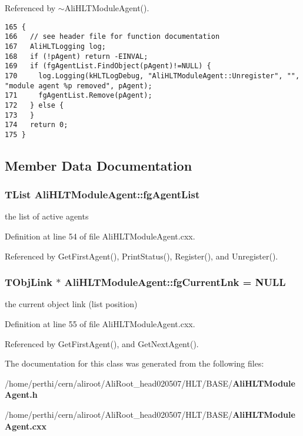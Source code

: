 Referenced by $\sim$Ali\-HLTModule\-Agent().

\footnotesize\begin{verbatim}165 {
166   // see header file for function documentation
167   AliHLTLogging log;
168   if (!pAgent) return -EINVAL;
169   if (fgAgentList.FindObject(pAgent)!=NULL) {
170     log.Logging(kHLTLogDebug, "AliHLTModuleAgent::Unregister", "", "module agent %p removed", pAgent);
171     fgAgentList.Remove(pAgent);
172   } else {
173   }
174   return 0;
175 }
\end{verbatim}\normalsize 




\subsection{Member Data Documentation}
\subsubsection{\setlength{\rightskip}{0pt plus 5cm}TList {\bf Ali\-HLTModule\-Agent::fg\-Agent\-List}\hspace{0.3cm}{\tt  [static, private]}}\label{classAliHLTModuleAgent_v0}


the list of active agents 

Definition at line 54 of file Ali\-HLTModule\-Agent.cxx.

Referenced by Get\-First\-Agent(), Print\-Status(), Register(), and Unregister().
\subsubsection{\setlength{\rightskip}{0pt plus 5cm}TObj\-Link $\ast$ {\bf Ali\-HLTModule\-Agent::fg\-Current\-Lnk} = NULL\hspace{0.3cm}{\tt  [static, private]}}\label{classAliHLTModuleAgent_v1}


the current object link (list position) 

Definition at line 55 of file Ali\-HLTModule\-Agent.cxx.

Referenced by Get\-First\-Agent(), and Get\-Next\-Agent().

The documentation for this class was generated from the following files:\begin{CompactItemize}
\item 
/home/perthi/cern/aliroot/Ali\-Root\_\-head020507/HLT/BASE/{\bf Ali\-HLTModule\-Agent.h}\item 
/home/perthi/cern/aliroot/Ali\-Root\_\-head020507/HLT/BASE/{\bf Ali\-HLTModule\-Agent.cxx}\end{CompactItemize}
